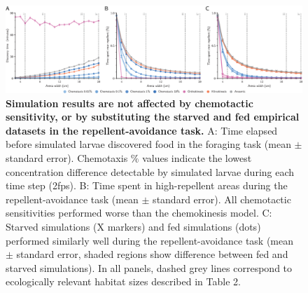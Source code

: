 \begin{figure}[t!]
  \includegraphics[width=\linewidth]{Figures/images/S4.eps}
  \caption{\textbf{ Simulation results are not affected by chemotactic sensitivity, or by substituting the starved and fed empirical datasets in the repellent-avoidance task.} A: Time elapsed before simulated larvae discovered food in the foraging task (mean ${\pm}$ standard error). Chemotaxis ${\%}$ values indicate the lowest concentration difference detectable by simulated larvae during each time step (2fps). B: Time spent in high-repellent areas during the repellent-avoidance task (mean ${\pm}$ standard error). All chemotactic sensitivities performed worse than the chemokinesis model. C: Starved simulations (X markers) and fed simulations (dots) performed similarly well during the repellent-avoidance task (mean ${\pm}$ standard error, shaded regions show difference between fed and starved simulations). In all panels, dashed grey lines correspond to ecologically relevant habitat sizes described in Table 2.}
\end{figure}